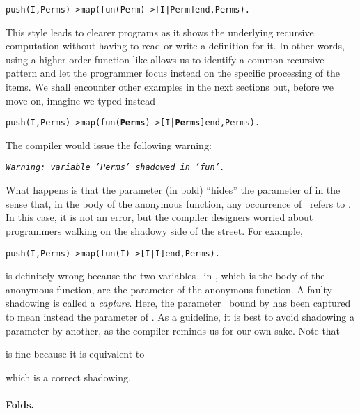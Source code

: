 \begin{alltt}
push(I,Perms) -> map(fun(Perm) -> [I|Perm] end,Perms).
\end{alltt}
This style leads to clearer programs as it shows the underlying
recursive computation without having to read or write a definition for
it. In other words, using a higher\hyp{}order function like
 allows us to identify a common recursive pattern and
let the programmer focus instead on the specific processing of the
items. We shall encounter other examples in the next sections but,
before we move on, imagine we typed instead
\begin{alltt}
push(I,Perms) -> map(fun(\textbf{Perms}) -> [I|\textbf{Perms}] end,Perms).
\end{alltt}
The \Erlang compiler would issue the following warning:
\begin{center}
\emph{\texttt{Warning: variable 'Perms' shadowed in
    'fun'.}}\label{shadowing}
\end{center}
What happens is that the parameter \textbf{} (in bold)
``hides'' the parameter  of  in the
sense that, in the body of the anonymous function, any occurrence
of~ refers to \textbf{}. In this case,
it is not an error, but the compiler designers worried about
programmers walking on the shadowy side of the street. For example,
\begin{alltt}
push(I,Perms) -> map(fun(I) -> [I|I] end,Perms).\hfill% \emph{Capture}
\end{alltt}
is definitely wrong because the two variables~ in
\erlcode{[I|I]}, which is the body of the anonymous function, are the
parameter of the anonymous function. A faulty shadowing is called a
\emph{capture}. Here, the parameter~ bound by
 has been captured to mean instead the
parameter of . As a guideline, it is best to avoid
shadowing a parameter by another, as the \Erlang compiler reminds us
for our own sake. Note that
\begin{center}
\end{center}
is fine because it is equivalent to
\begin{center}
\end{center}
which is a correct shadowing.

\medskip

\paragraph{Folds.}

